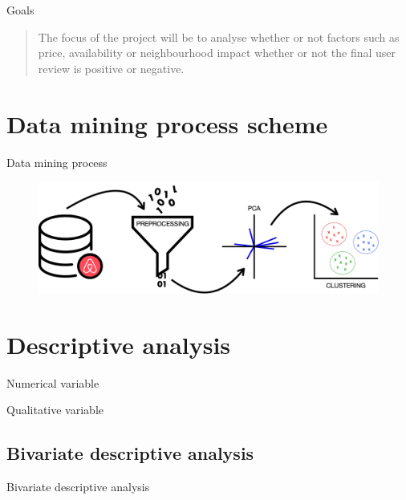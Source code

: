 \begin{frame}{Goals}
\begin{quote}
The focus of the project will be to analyse whether or not factors
such as price, availability or neighbourhood impact whether or not the final
user review is positive or negative.
\end{quote}
\end{frame}

\section{Data mining process scheme}
\begin{frame}{Data mining process}
\begin{figure}[H]
    \centering
    \includegraphics[width=0.75\linewidth]{../final/images/workflow}
\end{figure}
\end{frame}

\section{Descriptive analysis}
\begin{frame}{Numerical variable}
\vspace{0.7em}
\end{frame}

\begin{frame}{Qualitative variable}
\vspace{1.5em}
\end{frame}


\subsection{Bivariate descriptive analysis}
\begin{frame}{Bivariate descriptive analysis}
\end{frame}

